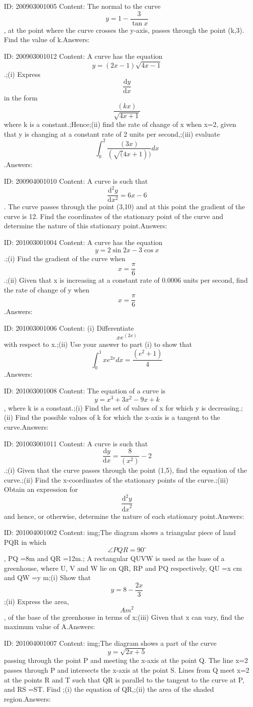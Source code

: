 \documentclass{article}
\begin{document}
ID: 200903001005
Content:
The normal to the curve $$y=1-\frac{3}{\tan x}$$, at the point where the curve crosses the y-axis, passes through the point (k,3). Find the value of k.Answers:

ID: 200903001012
Content:
A curve has the equation $$y=(2x-1)\sqrt{4x-1}$$.;(i) Express $$\frac{\mathrm{d}y}{\mathrm{d} x}$$ in the form $$\frac{(kx)}{\sqrt{4x+1}}$$ where k is a constant.;Hence;(ii) find the rate of change of x when x=2, given that y is changing at a constant rate of 2 units per second,;(iii) evaluate $$\int_0^2\frac{(3x)}{(\sqrt(4x+1))} dx$$.Answers:

ID: 200904001010
Content:
A curve is such that $$\frac{\mathrm{d} ^{2}y}{\mathrm{d} x^{2}}= 6x-6$$. The curve passes through the point (3,10) and at this point the gradient of the curve is 12. Find the coordinates of the stationary point of the curve and determine the nature of this stationary point.Answers:

ID: 201003001004
Content:
A curve has the equation $$y =2\sin 2x -3\cos x$$.;(i) Find the gradient of the curve when $$x= \frac{\pi }{6}$$.;(ii) Given that x is increasing at a constant rate of 0.0006 units per second, find the rate of change of y when $$x= \frac{\pi }{6}$$.Answers:

ID: 201003001006
Content:
(i) Differentiate $$xe^{(2x)}$$ with respect to x.;(ii) Use your answer to part (i) to show that $$\int_0^1 xe^{2x} dx = \frac{(e^2+1)}{4}$$.Answers:

ID: 201003001008
Content:
The equation of a curve is $$y =x^3+3x^2-9x+k$$, where k is a constant.;(i) Find the set of values of x for which y is decreasing.;(ii) Find the possible values of k for which the x-axis is a tangent to the curve.Answers:

ID: 201003001011
Content:
A curve is such that $$\frac{\mathrm{d} y}{\mathrm{d} x} = \frac{8}{(x^2)}-2$$.;(i) Given that the curve passes through the point (1,5), find the equation of the curve.;(ii) Find the x-coordinates of the stationary points of the curve.;(iii) Obtain an expression for $$ \frac{\mathrm{d} ^{2}y}{{\mathrm{d} x}^{2}}$$ and hence, or otherwise, determine the nature of each stationary point.Answers:

ID: 201004001002
Content:
img;The diagram shows a triangular piece of land PQR in which $$\angle PQR =90^{\circ}$$, PQ =8m and QR =12m.; A rectangular QUVW is used as the base of a greenhouse, where U, V and W lie on QR, RP and PQ respectively, QU =x cm and QW =y m;(i) Show that $$y =8-\frac{2x}{3}$$;(ii) Express the area, $$A m^2$$, of the base of the greenhouse in terms of x;(iii) Given that x can vary, find the maximum value of A.Answers:

ID: 201004001007
Content:
img;The diagram shows a part of the curve $$y =\sqrt{2x+5}$$ passing through the point P and meeting the x-axis at the point Q. The line x=2 passes through P and intersects the x-axis at the point S. Lines from Q meet x=2 at the points R and T such that QR is parallel to the tangent to the curve at P, and RS =ST. Find ;(i) the equation of QR,;(ii) the area of the shaded region.Answers:
\end{document}

